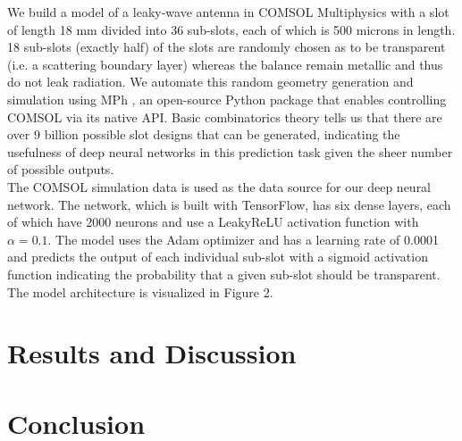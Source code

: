 \documentclass[11pt]{article}
\begin{document}
\noindent We build a model of a leaky-wave antenna in COMSOL Multiphysics with a slot of length 18 mm divided into 36 sub-slots, each of which is 500 microns in length. 18 sub-slots (exactly half) of the slots are randomly chosen as to be transparent (i.e. a scattering boundary layer) whereas the balance remain metallic and thus do not leak radiation. We automate this random geometry generation and simulation using MPh \cite{john_hennig_2022_6312347}, an open-source Python package that enables controlling COMSOL via its native API. Basic combinatorics theory tells us that there are over 9 billion possible slot designs that can be generated, indicating the usefulness of deep neural networks in this prediction task given the sheer number of possible outputs. \\

\noindent The COMSOL simulation data is used as the data source for our deep neural network. The network, which is built with TensorFlow, has six dense layers, each of which have 2000 neurons and use a LeakyReLU activation function with $\alpha = 0.1$. The model uses the Adam optimizer and has a learning rate of 0.0001 and predicts the output of each individual sub-slot with a sigmoid activation function indicating the probability that a given sub-slot should be transparent. The model architecture is visualized in Figure 2.

\section*{Results and Discussion}

\section*{Conclusion}



\end{document}
